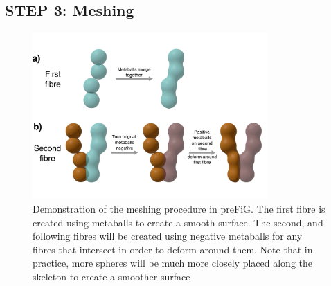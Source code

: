 \subsection{STEP 3: Meshing}
\label{sec:ipmi_step3_meshing}

\begin{figure}
  \centering
  \includegraphics[width=0.8\textwidth]{figures/config/METABALL_fig.png}
  \caption[\ac{preFiG} meshing procedure]{Demonstration of the meshing procedure in \ac{preFiG}. The first fibre is created using metaballs to create a smooth surface. The second, and following fibres will be created using negative metaballs for any fibres that intersect in order to deform around them. Note that in practice, more spheres will be much more closely placed along the skeleton to create a smoother surface}
  \label{fig:ipmi_meshing}
\end{figure}


